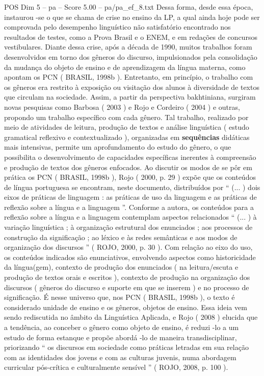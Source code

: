 \begin{textsample}{POS Dim 5 – pa – Score 5.00 – pa/pa\_ef\_8.txt}
Dessa forma, desde essa época, instaurou -se o que se chama de crise no ensino da LP, a qual ainda hoje pode ser comprovada pelo desempenho linguístico não satisfatório encontrado nos resultados de testes, como a Prova Brasil e o ENEM, e em redações de concursos vestibulares.
Diante dessa crise, após a década de 1990, muitos trabalhos foram desenvolvidos em torno dos gêneros do discurso, impulsionados pela consolidação da mudança do objeto de ensino e de aprendizagem da língua materna, como apontam os PCN ( BRASIL, 1998b ).
Entretanto, em princípio, o trabalho com os gêneros era restrito à exposição ou visitação dos alunos à diversidade de textos que circulam na sociedade.
Assim, a partir da perspectiva bakhtiniana, surgiram novas pesquisas como Barbosa ( 2003 ) e Rojo e Cordeiro ( 2004 ) e outras, propondo um trabalho específico com cada gênero.
Tal trabalho, realizado por meio de atividades de leitura, produção de textos e análise linguística ( estudo gramatical reflexivo e contextualizado ), organizadas em \textbf{sequências} didáticas mais intensivas, permite um aprofundamento do estudo do gênero, o que possibilita o desenvolvimento de capacidades específicas inerentes à compreensão e produção de textos dos gêneros enfocados.
Ao discutir os modos de se pôr em prática os PCN ( BRASIL, 1998b ), Rojo ( 2000, p. 29 ) expõe que os conteúdos de língua portuguesa se encontram, neste documento, distribuídos por “ (... ) dois eixos de práticas de linguagem : as práticas de uso da linguagem e as práticas de reflexão sobre a língua e a linguagem ”.
Conforme a autora, os conteúdos para a reflexão sobre a língua e a linguagem contemplam aspectos relacionados “ (... ) à variação linguística ; à organização estrutural dos enunciados ; aos processos de construção da significação ; ao léxico e às redes semânticas e aos modos de organização dos discursos ” ( ROJO, 2000, p. 30 ).
Com relação ao eixo do uso, os conteúdos indicados são enunciativos, envolvendo aspectos como historicidade da língua(gem), contexto de produção dos enunciados ( na leitura/escuta e produção de textos orais e escritos ), contexto de produção na organização dos discursos ( gêneros do discurso e suporte em que se inserem ) e no processo de significação.
É nesse universo que, nos PCN ( BRASIL, 1998b ), o texto é considerado unidade de ensino e os gêneros, objetos de ensino.
Essa ideia vem sendo rediscutida no âmbito da Linguística Aplicada, e Rojo ( 2008 ) elucida que a tendência, ao conceber o gênero como objeto de ensino, é reduzi -lo a um estudo de forma estanque e propõe abordá -lo de maneira transdisciplinar, priorizando “ os discursos em sociedade como práticas letradas em sua relação com as identidades dos jovens e com as culturas juvenis, numa abordagem curricular pós-crítica e culturalmente sensível ” ( ROJO, 2008, p. 100 ).

\end{textsample}
